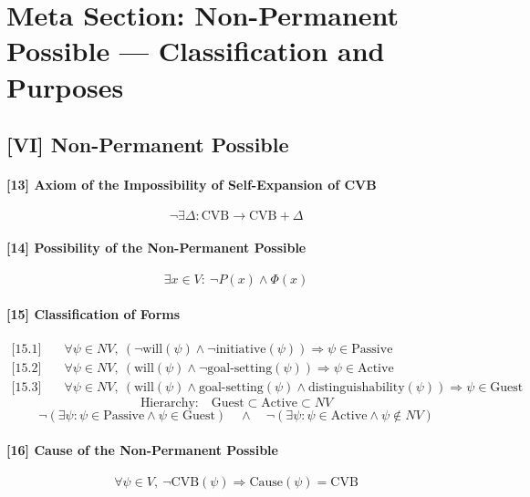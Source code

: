\documentclass[12pt]{article}
\begin{document}
\section*{Meta Section: Non-Permanent Possible — Classification and Purposes}

\subsection*{[VI] Non-Permanent Possible}

\paragraph{[13] Axiom of the Impossibility of Self-Expansion of CVB}
\[
\neg \exists \Delta : \mathrm{CVB} \rightarrow \mathrm{CVB} + \Delta
\]

\paragraph{[14] Possibility of the Non-Permanent Possible}
\[
\exists x \in V:\ \neg P(x) \land \Phi(x)
\]

\paragraph{[15] Classification of Forms}
\begin{align*}
\text{[15.1]} &\quad \forall \psi \in NV,\ (\neg \text{will}(\psi) \land \neg \text{initiative}(\psi)) \Rightarrow \psi \in \text{Passive} \\
\text{[15.2]} &\quad \forall \psi \in NV,\ (\text{will}(\psi) \land \neg \text{goal-setting}(\psi)) \Rightarrow \psi \in \text{Active} \\
\text{[15.3]} &\quad \forall \psi \in NV,\ (\text{will}(\psi) \land \text{goal-setting}(\psi) \land \text{distinguishability}(\psi)) \Rightarrow \psi \in \text{Guest}
\end{align*}
\[
\text{Hierarchy:} \quad \text{Guest} \subset \text{Active} \subset NV
\]
\[
\neg(\exists \psi : \psi \in \text{Passive} \land \psi \in \text{Guest}) \quad \land \quad 
\neg(\exists \psi : \psi \in \text{Active} \land \psi \notin NV)
\]

\paragraph{[16] Cause of the Non-Permanent Possible}
\[
\forall \psi \in V,\ \neg \text{CVB}(\psi) \Rightarrow \text{Cause}(\psi) = \text{CVB}
\]
\end{document}
